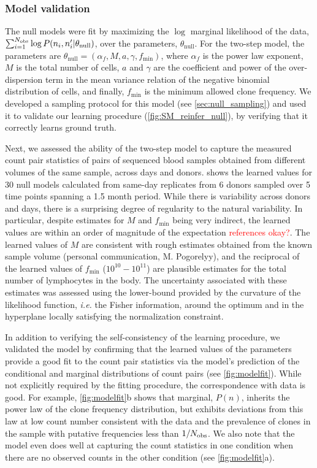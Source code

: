 \documentclass[letterpaper,english,prl,reprint,longbibliography]{revtex4-1} %
\newcommand{\re}[1]{\textcolor{red}{#1}}
\begin{document}
\subsubsection*{Model validation}
The null models were fit by maximizing the $\log$ marginal likelihood of the data, $\sum_{i=1}^{N_{\textrm{\textrm{obs}}}} \log P(n_i,n^{\prime}_i|\theta_{\text{null}})$, over the parameters, $\theta_{\text{null}}$. 
For the two-step model, the parameters are $\theta_{\text{null}}=(\alpha_f,M,a,\gamma,f_{\textrm{min}})$, where $\alpha_f$ is the power law exponent, $M$ is the total number of cells, $a$ and $\gamma$ are the coefficient and power of the over-dispersion term in the mean variance relation of the negative binomial distribution of cells, and finally, $f_{\textrm{min}}$ is the minimum allowed clone frequency.
We developed a sampling protocol for this model (see \cref{sec:null_sampling}) and used it to validate our learning procedure (\cref{fig:SM_reinfer_null}), by verifying that it correctly learns ground truth.

Next, we assessed the ability of the two-step model to capture the measured count pair statistics of pairs of sequenced blood samples obtained from different volumes of the same sample, across days and donors. 
 shows the learned values for 30 null models calculated from same-day replicates from 6 donors sampled over 5 time points spanning a 1.5 month period. 
While there is variability across donors and days, there is a surprising degree of regularity to the natural variability. In particular, despite estimates for $M$ and $f_\textrm{min}$ being very indirect, the learned values are within an order of magnitude of the expectation \re{references okay?}\citep{Mora2018,Mora2019,Qi2014}. 
The learned values of $M$ are consistent with rough estimates obtained from the known sample volume (personal communication, M. Pogorelyy), and the reciprocal of the learned values of $f_{\textrm{min}}$ ($10^{10}-10^{11}$) are plausible estimates for the total number of lymphocytes in the body.
The uncertainty associated with these estimates was assessed using the lower-bound provided by the curvature of the likelihood function, \emph{i.e.} the Fisher information, around the optimum and in the hyperplane locally satisfying the normalization constraint. 

In addition to verifying the self-consistency of the learning procedure, we validated the model by confirming that the learned values of the parameters provide a good fit to the count pair statistics via the model's prediction of the conditional and marginal distributions of count pairs (see \cref{fig:modelfit}). While not explicitly required by the fitting procedure, the correspondence with data is good. For example, \cref{fig:modelfit}b shows that marginal, $P(n)$, inherits the power law of the clone frequency distribution, but exhibits deviations from this law at low count number consistent with the data and the prevalence of clones in the sample with putative frequencies less than $1/N_{\textrm{\textrm{obs}}}$. We also note that the model even does well at capturing the count statistics in one condition when there are no observed counts in the other condition (see \cref{fig:modelfit}a).
\end{document}
